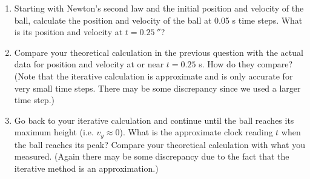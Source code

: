 \begin{description}
\begin{enumerate}
	\item Starting with Newton's second law and the initial position and velocity of the ball, calculate the position and velocity of the ball at 0.05 s time steps. What is its position and velocity at $t=0.25\ \second$?
	\item Compare your theoretical calculation in the previous question with the actual data for position and velocity at or near $t = 0.25$ s. How do they compare? (Note that the iterative calculation is approximate and is only accurate for very small time steps. There may be some discrepancy since we used a larger time step.)
	\item Go back to your iterative calculation and continue until the ball reaches its maximum height (i.e. $v_y\approx0$). What is the approximate clock reading $t$ when the ball reaches its peak? Compare your theoretical calculation with what you measured. (Again there may be some discrepancy due to the fact that the iterative method is an approximation.)
\end{enumerate}
\end{description}


%
%
%
%
%

